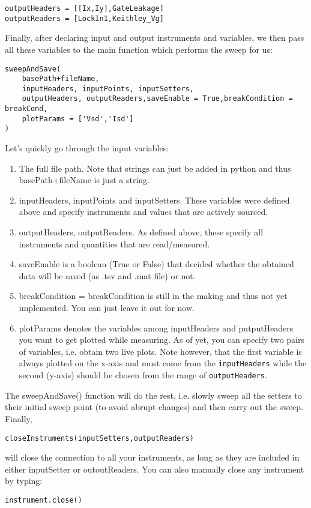 \begin{verbatim}
outputHeaders = [[Ix,Iy],GateLeakage]
outputReaders = [LockIn1,Keithley_Vg]
\end{verbatim}
Finally, after declaring input and output instruments and variables, we then pass all these variables to the main function which performs the sweep for us:
\begin{verbatim}
sweepAndSave(
    basePath+fileName,
    inputHeaders, inputPoints, inputSetters,
    outputHeaders, outputReaders,saveEnable = True,breakCondition = breakCond,
    plotParams = ['Vsd','Isd']
)
\end{verbatim} 
Let's quickly go through the input variables: 
\begin{enumerate}
\item The full file path. Note that strings can just be added in python and thus basePath+fileName is just a string.
\item inputHeaders, inputPoints and inputSetters. These variables were defined above and specify instruments and values that are actively sourced.
\item outputHeaders, outputReaders. As defined above, these specify all instruments and quantities that are read/measured.
\item saveEnable is a boolean (True or False) that decided whether the obtained data will be saved (as .tsv and .mat file) or not.
\item breakCondition = breakCondition is still in the making and thus not yet implemented. You can just leave it out for now.
\item plotParams denotes the variables among inputHeaders and putputHeaders you want to get plotted while measuring. As of yet, you can specify two pairs of variables, i.e. obtain two live plots. Note however, that the first variable is always plotted on the x-axis and must come from the \texttt{inputHeaders}  while the second (y-axis) should be chosen from the range of \texttt{outputHeaders}.
\end{enumerate}
The sweepAndSave() function will do the rest, i.e. slowly sweep all the setters to their initial sweep point (to avoid abrupt changes) and then carry out the sweep. Finally,
\begin{verbatim}
closeInstruments(inputSetters,outputReaders)
\end{verbatim}
will close the connection to all your instruments, as long as they are included in either inputSetter or outoutReaders. You can also manually close any instrument by typing:
\begin{verbatim}
instrument.close()
\end{verbatim}
